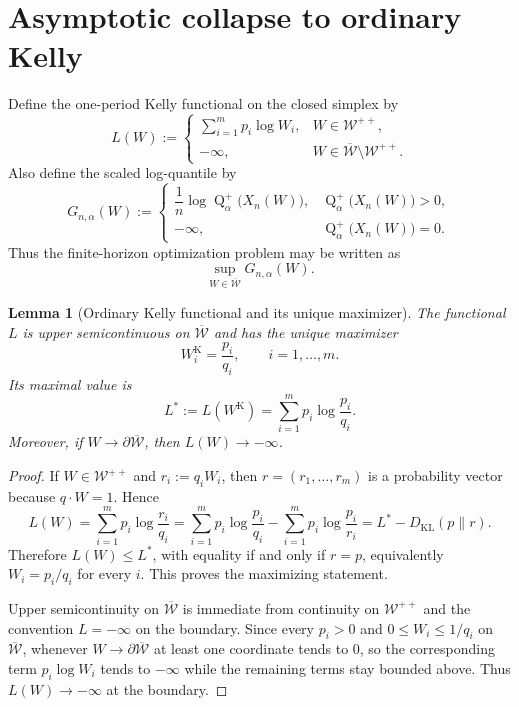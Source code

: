 \documentclass[11pt]{article}
\newtheorem{lemma}[lemma]{Lemma}
\theoremstyle{definition}
\newcommand{\1}{\mathbf{1}}
\newcommand{\Quant}{\operatorname{Q}}
\begin{document}
\section{Asymptotic collapse to ordinary Kelly}

Define the one-period Kelly functional on the closed simplex by
\[
L(W):=
\begin{cases}
\sum_{i=1}^m p_i \log W_i, & W\in \mathcal W^{++},\\
-\infty, & W\in \overline{\mathcal W}\setminus \mathcal W^{++}.
\end{cases}
\]
Also define the scaled log-quantile by
\[
G_{n,\alpha}(W):=
\begin{cases}
\dfrac1n \log \Quant_\alpha^+\bigl(X_n(W)\bigr), & \Quant_\alpha^+\bigl(X_n(W)\bigr)>0,\\
-\infty, & \Quant_\alpha^+\bigl(X_n(W)\bigr)=0.
\end{cases}
\]
Thus the finite-horizon optimization problem may be written as
\[
\sup_{W\in\overline{\mathcal W}} G_{n,\alpha}(W).
\]

\begin{lemma}[Ordinary Kelly functional and its unique maximizer]\label{lem:kelly-functional}
The functional $L$ is upper semicontinuous on $\overline{\mathcal W}$ and has the unique maximizer
\[
W^{\mathrm K}_i=\frac{p_i}{q_i},
\qquad i=1,\dots,m.
\]
Its maximal value is
\[
L^*:=L(W^{\mathrm K})=\sum_{i=1}^m p_i \log \frac{p_i}{q_i}.
\]
Moreover, if $W\to \partial \overline{\mathcal W}$, then $L(W)\to -\infty$.
\end{lemma}

\begin{proof}
If $W\in \mathcal W^{++}$ and $r_i:=q_iW_i$, then $r=(r_1,\dots,r_m)$ is a probability vector because $q\cdot W=1$. Hence
\[
L(W)=\sum_{i=1}^m p_i \log \frac{r_i}{q_i}
=\sum_{i=1}^m p_i \log \frac{p_i}{q_i}-\sum_{i=1}^m p_i \log \frac{p_i}{r_i}
=L^*-D_{\mathrm{KL}}(p\|r).
\]
Therefore $L(W)\le L^*$, with equality if and only if $r=p$, equivalently $W_i=p_i/q_i$ for every $i$. This proves the maximizing statement.

Upper semicontinuity on $\overline{\mathcal W}$ is immediate from continuity on $\mathcal W^{++}$ and the convention $L=-\infty$ on the boundary. Since every $p_i>0$ and $0\le W_i\le 1/q_i$ on $\overline{\mathcal W}$, whenever $W\to \partial \overline{\mathcal W}$ at least one coordinate tends to $0$, so the corresponding term $p_i\log W_i$ tends to $-\infty$ while the remaining terms stay bounded above. Thus $L(W)\to -\infty$ at the boundary.
\end{proof}
\end{document}
